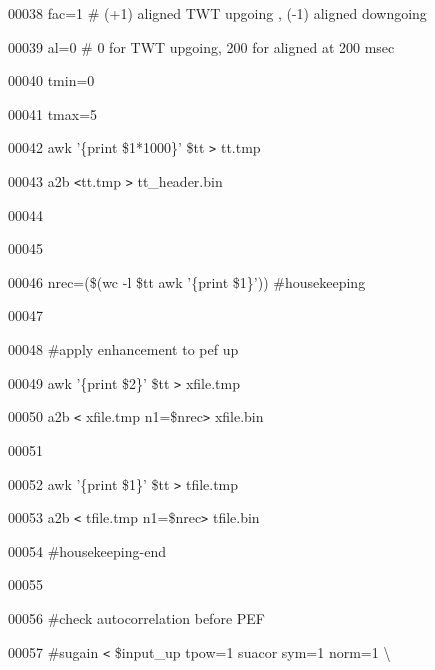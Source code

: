 \documentclass{article}
\begin{document}
\vspace{4pt}
00038 fac=1 \# (+1) aligned TWT upgoing , (-1) aligned downgoing

\vspace{4pt}
00039 al=0 \# 0 for TWT upgoing, 200 for aligned at 200 msec

\vspace{4pt}
00040 tmin=0

\vspace{4pt}
00041 tmax=5

\vspace{4pt}
00042 awk '\{print \$1*1000\}' \$tt \texttt{>} tt.tmp 

\vspace{4pt}
00043 a2b \texttt{<}tt.tmp \texttt{>} tt\_header.bin

\vspace{4pt}
00044 

\vspace{4pt}
00045 

\vspace{4pt}
00046 nrec=(\$(wc -l \$tt \textbar{} awk '\{print \$1\}')) \#housekeeping

\vspace{4pt}
00047 

\vspace{4pt}
00048 \#apply enhancement to pef up

\vspace{4pt}
00049 awk '\{print \$2\}' \$tt \texttt{>} xfile.tmp

\vspace{4pt}
00050 a2b \texttt{<} xfile.tmp n1=\$nrec\texttt{>} xfile.bin

\vspace{4pt}
00051 

\vspace{4pt}
00052 awk '\{print \$1\}' \$tt \texttt{>} tfile.tmp

\vspace{4pt}
00053 a2b \texttt{<} tfile.tmp n1=\$nrec\texttt{>} tfile.bin

\vspace{4pt}
00054 \#housekeeping-end

\vspace{4pt}
00055 

\vspace{4pt}
00056 \#check autocorrelation before PEF

\vspace{4pt}
00057 \#sugain \texttt{<} \$input\_up tpow=1 \textbar{} suacor sym=1 norm=1 \textbackslash{}
\end{document}
